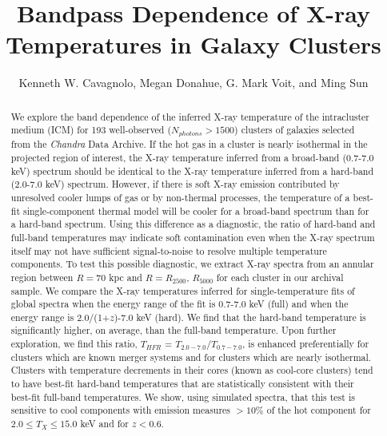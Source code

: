 \documentclass{emulateapj}
\begin{document}
\title{Bandpass Dependence of X-ray Temperatures in Galaxy Clusters}
\author{Kenneth W. Cavagnolo, Megan
Donahue, G. Mark Voit, and Ming
Sun}


\begin{abstract}

We explore the band dependence of the inferred X-ray temperature of
the intracluster medium (ICM) for 193 well-observed ($N_{photons} >
1500$) clusters of galaxies selected from the {\it Chandra} Data Archive. If
the hot gas in a cluster is nearly isothermal in the projected region
of interest, the X-ray temperature inferred from a broad-band
(0.7-7.0 keV) spectrum should be identical to the X-ray temperature
inferred from a hard-band (2.0-7.0 keV) spectrum. However, if there is
soft X-ray emission contributed by unresolved cooler lumps of gas or by
non-thermal processes, the temperature of a best-fit 
single-component thermal model will be cooler for a broad-band
spectrum than for a hard-band spectrum. Using this difference as a
diagnostic, the ratio of hard-band and full-band temperatures may
indicate soft contamination even when the X-ray spectrum itself may
not have sufficient signal-to-noise to resolve multiple temperature
components. To test this possible diagnostic, we extract X-ray spectra
from an annular region between $R=70$ kpc and $R=R_{2500}$, $R_{5000}$ for
each cluster in our archival sample. We compare the X-ray temperatures
inferred for single-temperature fits of global spectra when the energy
range of the fit is 0.7-7.0 keV (full) and when the energy range is
2.0/(1+$z$)-7.0 keV (hard). We find that the hard-band
temperature is significantly higher, on average, than the full-band 
temperature. Upon further exploration, we find this ratio,
$T_{HFR}$ = $T_{2.0-7.0}$/$T_{0.7-7.0}$, is enhanced preferentially for clusters which are
known merger systems and for clusters which are nearly isothermal. Clusters
with temperature decrements in their cores (known as cool-core
clusters) tend to have best-fit hard-band temperatures that are
statistically consistent with their best-fit full-band
temperatures. We show, using simulated spectra, that this test is
sensitive to cool components with emission measures $> 10\%$ of the
hot component for $2.0 \leq T_{X} \leq 15.0$ keV and for $z < 0.6$.
\end{abstract}
\end{document}
